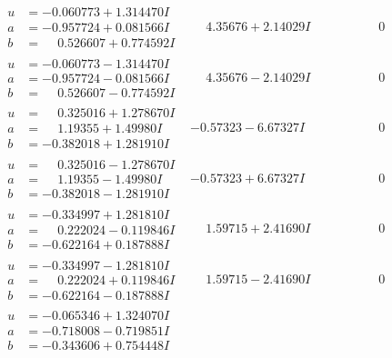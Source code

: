 \documentclass[1p]{elsarticle_modified}
\theoremstyle{definition}
\begin{document}
$$\begin{array}{c|c|c}
\begin{aligned}
u &= -0.060773 + 1.314470 I \\
a &= -0.957724 + 0.081566 I \\
b &= \phantom{-}0.526607 + 0.774592 I\end{aligned}
 & \phantom{-}4.35676 + 2.14029 I & \phantom{-0.000000 } 0 \\ \hline\begin{aligned}
u &= -0.060773 - 1.314470 I \\
a &= -0.957724 - 0.081566 I \\
b &= \phantom{-}0.526607 - 0.774592 I\end{aligned}
 & \phantom{-}4.35676 - 2.14029 I & \phantom{-0.000000 } 0 \\ \hline\begin{aligned}
u &= \phantom{-}0.325016 + 1.278670 I \\
a &= \phantom{-}1.19355 + 1.49980 I \\
b &= -0.382018 + 1.281910 I\end{aligned}
 & -0.57323 - 6.67327 I & \phantom{-0.000000 } 0 \\ \hline\begin{aligned}
u &= \phantom{-}0.325016 - 1.278670 I \\
a &= \phantom{-}1.19355 - 1.49980 I \\
b &= -0.382018 - 1.281910 I\end{aligned}
 & -0.57323 + 6.67327 I & \phantom{-0.000000 } 0 \\ \hline\begin{aligned}
u &= -0.334997 + 1.281810 I \\
a &= \phantom{-}0.222024 - 0.119846 I \\
b &= -0.622164 + 0.187888 I\end{aligned}
 & \phantom{-}1.59715 + 2.41690 I & \phantom{-0.000000 } 0 \\ \hline\begin{aligned}
u &= -0.334997 - 1.281810 I \\
a &= \phantom{-}0.222024 + 0.119846 I \\
b &= -0.622164 - 0.187888 I\end{aligned}
 & \phantom{-}1.59715 - 2.41690 I & \phantom{-0.000000 } 0 \\ \hline\begin{aligned}
u &= -0.065346 + 1.324070 I \\
a &= -0.718008 - 0.719851 I \\
b &= -0.343606 + 0.754448 I\end{aligned}

\end{array}$$
\end{document}

